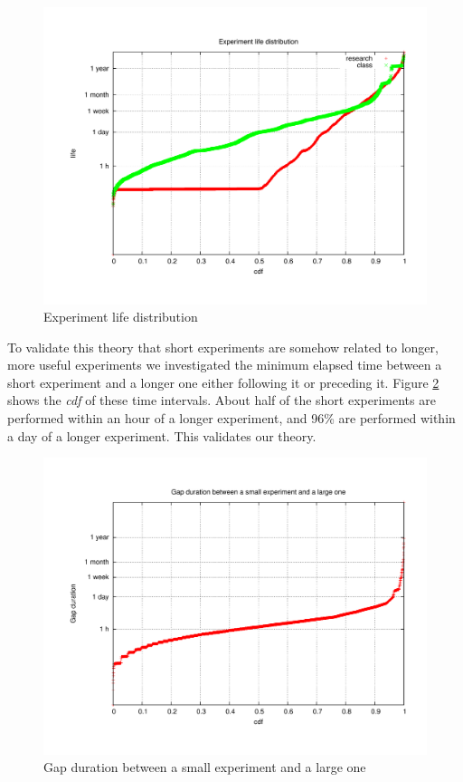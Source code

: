 \documentclass[10pt]{article}
\begin{document}
\begin{figure}[htbp]
\begin{center}
\includegraphics[width=5in]{figs/exlife.pdf}
\caption{Experiment life distribution}
\label{exlife}
\end{center}
\end{figure}

To validate this theory that short experiments are somehow related to longer, more useful
experiments we investigated the minimum elapsed time between a short experiment and 
a longer one either following it or preceding it. Figure \ref{gaps} shows the \textit{cdf} of
these time intervals. About half of the short experiments are performed within an hour of
a longer experiment, and 96\% are performed within a day of a longer experiment. This validates 
our theory.

\begin{figure}[htbp]
\begin{center}
\includegraphics[width=5in]{figs/gaps.pdf}
\caption{Gap duration between a small experiment and a large one}
\label{gaps}
\end{center}
\end{figure}
\end{document}
